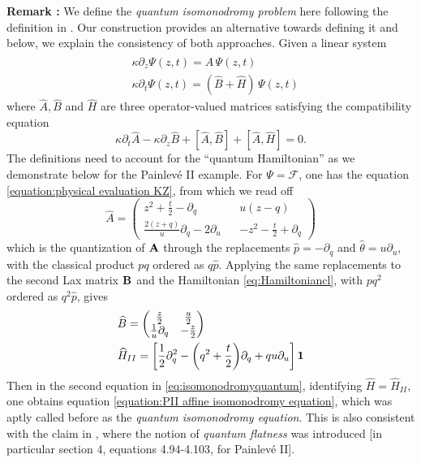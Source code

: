 \documentclass[a4paper,11pt]{article}
\numberwithin{equation}{section}
\begin{document}
{\bf{Remark :}} We define the {\it quantum isomonodromy problem} here following the definition in \cite{Jimbo_2008}. Our construction provides an alternative towards defining it and below, we explain the consistency of both approaches. Given a linear system 
\begin{equation}
\label{eq:isomonodromyquantum}
\begin{split}
& \kappa \partial_z \Psi(z,t) = \widehat{A}\, \Psi(z,t) 
\\ & 
\kappa \partial_t \Psi(z,t) = (\widehat{B}+\widehat{H})\, \Psi(z,t)
\end{split}    
\end{equation}
where $\widehat{A},\widehat{B}$ and $\widehat{H}$ are three operator-valued matrices satisfying the compatibility equation 
\begin{equation}
\kappa\partial_t \widehat{A} - \kappa\partial_z \widehat{B} + [\widehat{A},\widehat{B}] + [\widehat{A},\widehat{H}] = 0.
\end{equation}
The definitions need to account for the ``quantum Hamiltonian'' as we demonstrate below for the Painlev\'e II example. For $\Psi = \mathcal{F}$, one has the equation \eqref{equation:physical evaluation KZ}, from which we read off 
\begin{equation}
\widehat{A} = \begin{pmatrix}
z^2+ \frac{t}{2} - \partial_q && u(z-q) \\
\frac{2(z+q)}{u}\partial_q - 2\partial_u && -z^2 -\frac{t}{2} + \partial_q
\end{pmatrix}
\end{equation}
which is the quantization of ${\bf{A}}$ through the replacements $\hat{p} = -\partial_q$ and $\hat{\theta} = u\partial_u$, with the classical product $pq$ ordered as $q\hat{p}$. Applying the same replacements to the second Lax matrix ${\bf{B}}$ and the Hamiltonian \eqref{eq:Hamiltoniancl}, with $pq^2$ ordered as $q^2\hat{p}$, gives
\begin{equation}
\begin{split}
&\widehat{B} = \begin{pmatrix}
\frac{z}{2} & \frac{u}{2} \\
\frac{1}{u}\partial_q & -\frac{z}{2}
\end{pmatrix}
\\ & 
\widehat{H}_{II} = \bigg[\frac12 \partial_q^2 - \bigg(q^2 + \frac{t}{2}\bigg)\partial_q + q u \partial_u\bigg] \, {\bf{1}}
\end{split}
\end{equation}
Then in the second equation in \eqref{eq:isomonodromyquantum}, identifying $\widehat{H} = \widehat{H}_{II}$, one obtains equation \eqref{equation:PII affine isomonodromy equation}, which was aptly called before as the {\it quantum isomonodromy equation}. This is also consistent with the claim in \cite{BanerjeeHaghighatLatifi2026}, where the notion of {\it quantum flatness} was introduced [in particular section 4, equations 4.94-4.103, for Painlev\'e II].  
\end{document}
